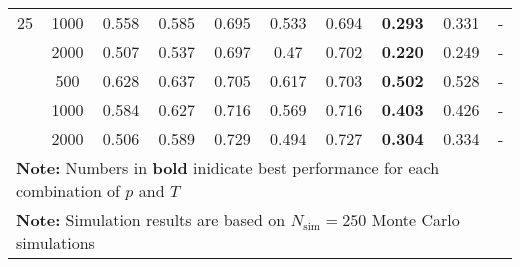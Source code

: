 \begin{landscape}
\begin{table}[p]
\begin{tabular}{cccccccccc}
	 25  & 1000 &       0.558        &           0.585           &            0.695            &           0.533           &            0.694            & \textbf{0.293}         &          0.331           & -                 \\ \hdashline
	 25  & 2000 &       0.507        &           0.537           &            0.697            &           0.47            &            0.702            & \textbf{0.220}         &          0.249           & -                 \\ \hdashline
	 36  & 500  &       0.628        &           0.637           &            0.705            &           0.617           &            0.703            & \textbf{0.502}         &          0.528           & -                 \\ \hdashline
	 36  & 1000 &       0.584        &           0.627           &            0.716            &           0.569           &            0.716            & \textbf{0.403}         &          0.426           & -                 \\ \hdashline
	 36  & 2000 &       0.506        &           0.589           &            0.729            &           0.494           &            0.727            & \textbf{0.304}         &          0.334           & -                 \\
	\hline
	\hline
    \multicolumn{10}{l}{\textbf{Note:} Numbers in \textbf{bold} inidicate best performance for each combination of $p$ and $T$} \\
    \multicolumn{10}{l}{\textbf{Note:} Simulation results are based on $N_\text{sim} = 250$ Monte Carlo simulations}
    \end{tabular}
    \end{table}
    \egroup
\end{landscape}
    